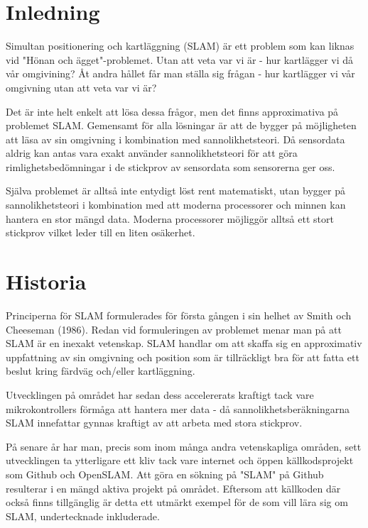 \documentclass[a4paper,12pt,fleqn]{article} \usepackage{fixltx2e}
\begin{document}
\section{Inledning}

Simultan positionering och kartläggning (SLAM) är ett problem som kan
liknas vid "Hönan och ägget"-problemet. Utan att veta var vi är - hur
kartlägger vi då vår omgivining? Åt andra hållet får man ställa sig
frågan - hur kartlägger vi vår omgivning utan att veta var vi är?

Det är inte helt enkelt att lösa dessa frågor, men det finns
approximativa på problemet SLAM. Gemensamt för alla lösningar är att de
bygger på möjligheten att läsa av sin omgivning i kombination med
sannolikhetsteori. Då sensordata aldrig kan antas vara exakt använder
sannolikhetsteori för att göra rimlighetsbedömningar i de stickprov av
sensordata som sensorerna ger oss.

Själva problemet är alltså inte entydigt löst rent matematiskt, utan
bygger på sannolikhetsteori i kombination med att moderna processorer
och minnen kan hantera en stor mängd data. Moderna processorer möjliggör
alltså ett stort stickprov vilket leder till en liten osäkerhet.

\section{Historia}

Principerna för SLAM formulerades för första gången i sin helhet av
Smith och Cheeseman (1986). Redan vid formuleringen av problemet menar
man på att SLAM är en inexakt vetenskap. SLAM handlar om att skaffa sig
en approximativ uppfattning av sin omgivning och position som är
tillräckligt bra för att fatta ett beslut kring färdväg och/eller
kartläggning.

Utvecklingen på området har sedan dess accelererats kraftigt tack vare
mikrokontrollers förmåga att hantera mer data - då
sannolikhetsberäkningarna SLAM innefattar gynnas kraftigt av att arbeta
med stora stickprov.

På senare år har man, precis som inom många andra vetenskapliga områden,
sett utvecklingen ta ytterligare ett kliv tack vare internet och öppen
källkodsprojekt som Github och OpenSLAM. Att göra en sökning på "SLAM"
på Github resulterar i en mängd aktiva projekt på området. Eftersom att
källkoden där också finns tillgänglig är detta ett utmärkt exempel för
de som vill lära sig om SLAM, undertecknade inkluderade.
\end{document}
